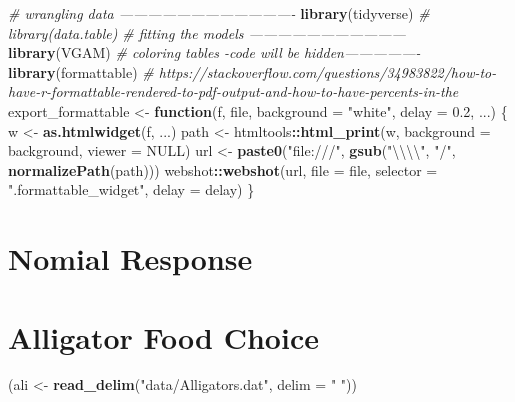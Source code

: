 \documentclass[]{book}
\newenvironment{Shaded}{\begin{snugshade}}{\end{snugshade}}
\newcommand{\CharTok}[1]{\textcolor[rgb]{0.31,0.60,0.02}{#1}}
\newcommand{\CommentTok}[1]{\textcolor[rgb]{0.56,0.35,0.01}{\textit{#1}}}
\newcommand{\ControlFlowTok}[1]{\textcolor[rgb]{0.13,0.29,0.53}{\textbf{#1}}}
\newcommand{\DataTypeTok}[1]{\textcolor[rgb]{0.13,0.29,0.53}{#1}}
\newcommand{\FloatTok}[1]{\textcolor[rgb]{0.00,0.00,0.81}{#1}}
\newcommand{\KeywordTok}[1]{\textcolor[rgb]{0.13,0.29,0.53}{\textbf{#1}}}
\newcommand{\NormalTok}[1]{#1}
\newcommand{\OperatorTok}[1]{\textcolor[rgb]{0.81,0.36,0.00}{\textbf{#1}}}
\newcommand{\OtherTok}[1]{\textcolor[rgb]{0.56,0.35,0.01}{#1}}
\newcommand{\StringTok}[1]{\textcolor[rgb]{0.31,0.60,0.02}{#1}}
\begin{document}
\begin{Shaded}
\begin{Highlighting}[]
\CommentTok{# wrangling data -------------------------------------}
\KeywordTok{library}\NormalTok{(tidyverse)}
\CommentTok{# library(data.table)}
\CommentTok{# fitting the models ---------------------------------}
\KeywordTok{library}\NormalTok{(VGAM)}
\CommentTok{# coloring tables -code will be hidden----------------}
\KeywordTok{library}\NormalTok{(formattable)}
\CommentTok{# https://stackoverflow.com/questions/34983822/how-to-have-r-formattable-rendered-to-pdf-output-and-how-to-have-percents-in-the}
\NormalTok{export_formattable <-}\StringTok{ }\ControlFlowTok{function}\NormalTok{(f, file, }\DataTypeTok{background =} \StringTok{"white"}\NormalTok{, }\DataTypeTok{delay =} \FloatTok{0.2}\NormalTok{, ...)}
\NormalTok{\{}
\NormalTok{  w <-}\StringTok{ }\KeywordTok{as.htmlwidget}\NormalTok{(f, ...)}
\NormalTok{  path <-}\StringTok{ }\NormalTok{htmltools}\OperatorTok{::}\KeywordTok{html_print}\NormalTok{(w, }\DataTypeTok{background =}\NormalTok{ background, }\DataTypeTok{viewer =} \OtherTok{NULL}\NormalTok{)}
\NormalTok{  url <-}\StringTok{ }\KeywordTok{paste0}\NormalTok{(}\StringTok{"file:///"}\NormalTok{, }\KeywordTok{gsub}\NormalTok{(}\StringTok{"}\CharTok{\textbackslash{}\textbackslash{}\textbackslash{}\textbackslash{}}\StringTok{"}\NormalTok{, }\StringTok{"/"}\NormalTok{, }\KeywordTok{normalizePath}\NormalTok{(path)))}
\NormalTok{  webshot}\OperatorTok{::}\KeywordTok{webshot}\NormalTok{(url,}
          \DataTypeTok{file =}\NormalTok{ file,}
          \DataTypeTok{selector =} \StringTok{".formattable_widget"}\NormalTok{,}
          \DataTypeTok{delay =}\NormalTok{ delay)}
\NormalTok{\}}
\end{Highlighting}
\end{Shaded}

\hypertarget{nomial-response}{%
\section{Nomial Response}\label{nomial-response}}

\hypertarget{alligator-food-choice}{%
\section*{Alligator Food Choice}\label{alligator-food-choice}}

\begin{Shaded}
\begin{Highlighting}[]
\NormalTok{(ali <-}\StringTok{ }\KeywordTok{read_delim}\NormalTok{(}\StringTok{"data/Alligators.dat"}\NormalTok{, }\DataTypeTok{delim =} \StringTok{" "}\NormalTok{))}
\end{Highlighting}
\end{Shaded}
\end{document}
